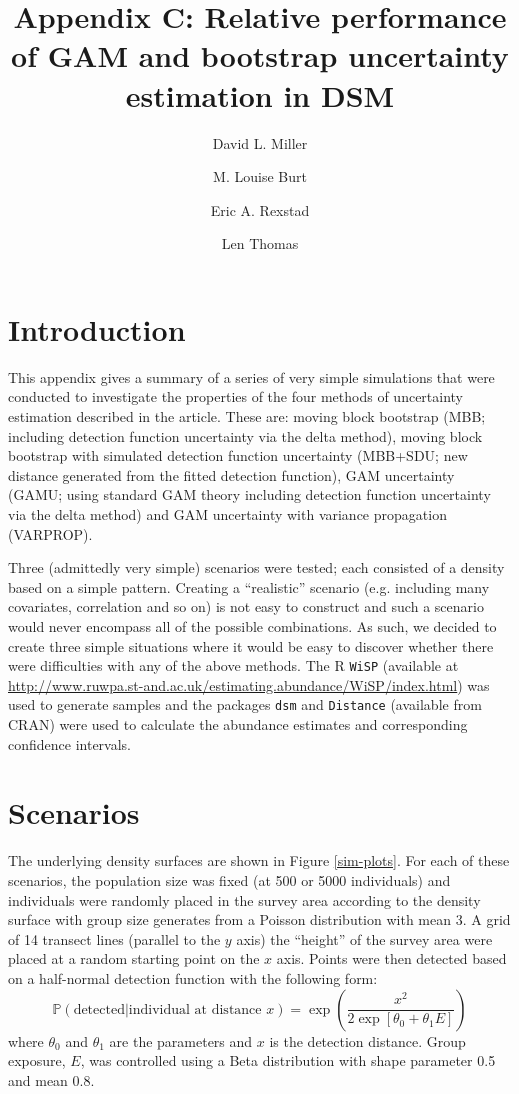 \documentclass[11pt]{amsart}
\title{Appendix C: Relative performance of GAM and bootstrap uncertainty estimation in DSM}
\author{David L. Miller \and
M. Louise Burt \and
Eric A. Rexstad \and 
Len Thomas}
\begin{document}
\maketitle


\section{Introduction}

This appendix gives a summary of a series of very simple simulations that were conducted to investigate the properties of the four methods of uncertainty estimation described in the article. These are: moving block bootstrap (MBB; including detection function uncertainty via the delta method), moving block bootstrap with simulated detection function uncertainty (MBB+SDU; new distance generated from the fitted detection function), GAM uncertainty (GAMU; using standard GAM theory including detection function uncertainty via the delta method) and GAM uncertainty with variance propagation (VARPROP).

Three (admittedly very simple) scenarios were tested; each consisted of a density based on a simple pattern. Creating a ``realistic'' scenario (e.g. including many covariates, correlation and so on) is not easy to construct and such a scenario would never encompass all of the possible combinations. As such, we decided to create three simple situations where it would be easy to discover whether there were difficulties with any of the above methods. The \textsf{R} \texttt{WiSP} (available at \url{http://www.ruwpa.st-and.ac.uk/estimating.abundance/WiSP/index.html}) was used to generate samples and the packages \texttt{dsm} and \texttt{Distance} (available from CRAN) were used to calculate the abundance estimates and corresponding confidence intervals.

\section{Scenarios}

The underlying density surfaces are shown in Figure \ref{sim-plots}. For each of these scenarios, the population size was fixed (at 500 or 5000 individuals) and individuals were randomly placed in the survey area according to the density surface with group size generates from a Poisson distribution with mean 3. A grid of 14 transect lines (parallel to the $y$ axis) the ``height'' of the survey area were placed at a random starting point on the $x$ axis. Points were then detected based on a half-normal detection function with the following form:
\begin{equation*}
\mathbb{P}\left( \text{detected} \vert \text{individual at distance } x \right) = \exp \left( \frac{x^2}{2 \exp \left[ \theta_0 + \theta_1 E \right]} \right)
\end{equation*}
where $\theta_0$ and $\theta_1$ are the parameters and $x$ is the detection distance. Group exposure, $E$, was controlled using a Beta distribution with shape parameter 0.5 and mean 0.8.
\end{document}
